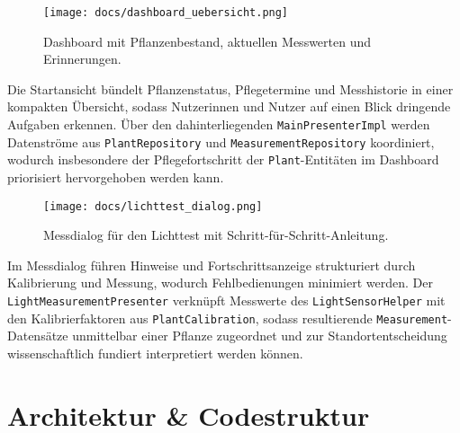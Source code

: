 \documentclass[14pt,a4paper]{report}
\begin{document}
\begin{figure}[hbtp]
    \centering
    \texttt{[image: docs/dashboard\_uebersicht.png]}
    \caption{Dashboard mit Pflanzenbestand, aktuellen Messwerten und Erinnerungen.}
\end{figure}

Die Startansicht bündelt Pflanzenstatus, Pflegetermine und Messhistorie in einer kompakten Übersicht, sodass Nutzerinnen und Nutzer auf einen Blick dringende Aufgaben erkennen. Über den dahinterliegenden \texttt{MainPresenterImpl} werden Datenströme aus \texttt{PlantRepository} und \texttt{MeasurementRepository} koordiniert, wodurch insbesondere der Pflegefortschritt der \texttt{Plant}-Entitäten im Dashboard priorisiert hervorgehoben werden kann.

\begin{figure}[hbtp]
    \centering
    \texttt{[image: docs/lichttest\_dialog.png]}
    \caption{Messdialog für den Lichttest mit Schritt-für-Schritt-Anleitung.}
\end{figure}

Im Messdialog führen Hinweise und Fortschrittsanzeige strukturiert durch Kalibrierung und Messung, wodurch Fehlbedienungen minimiert werden. Der \texttt{LightMeasurementPresenter} verknüpft Messwerte des \texttt{LightSensorHelper} mit den Kalibrierfaktoren aus \texttt{PlantCalibration}, sodass resultierende \texttt{Measurement}-Datensätze unmittelbar einer Pflanze zugeordnet und zur Standortentscheidung wissenschaftlich fundiert interpretiert werden können.

\chapter{Architektur \& Codestruktur}
\end{document}
